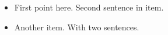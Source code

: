 \begin{itemize}
\item First point here. Second sentence in item.
\item Another item. With two sentences.
\end{itemize}
